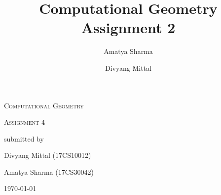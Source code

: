 \documentclass[8pt,english]{extarticle}
\title{Computational Geometry Assignment 2}
\author{Amatya Sharma \and Divyang Mittal}
\begin{document}
\begin{titlepage}
	\centering
	\vspace{4cm}
	{\scshape\LARGE Computational Geometry \par}
	\vspace{1cm}
	{\scshape\Large Assignment 4\par}

	\vfill
	submitted by\par
	Divyang Mittal (17CS10012) \par
	Amatya Sharma (17CS30042)

	\vfill

	{\large \today\par}
\end{titlepage}

\newpage









\newpage
%
%
\end{document}
